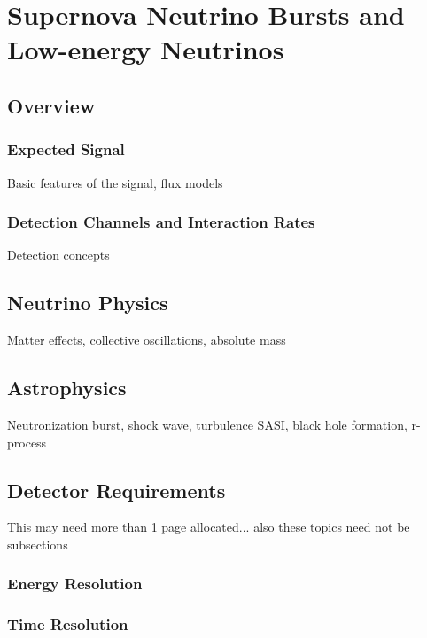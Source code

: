 \chapter{Supernova Neutrino Bursts and Low-energy Neutrinos}
\label{ch:physics-snblowe}

\section{Overview}
\label{sec:physics-snblowe-overview}

\subsection{Expected  Signal}

Basic features of the signal, flux models

\subsection{Detection Channels and Interaction Rates}

Detection concepts

\section{Neutrino Physics}
\label{sec:physics-snblowe-neutrino-physics}

Matter effects, collective oscillations, absolute mass

\section{Astrophysics}
\label{sec:physics-snblowe-astrophysics}

Neutronization burst, shock wave, turbulence SASI, black hole formation, r-process

\section{Detector Requirements}
\label{sec:physics-snblowe-detector-requirements}

This may need more than 1 page allocated... also these topics need not
be subsections

\subsection{Energy Resolution}
\subsection{Time Resolution}
